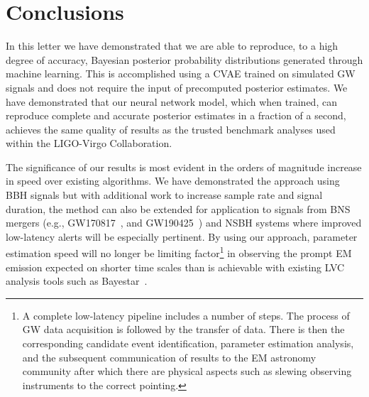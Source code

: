 %
%
%
\section{Conclusions}
In this letter we have demonstrated that we are able to reproduce, to a high
degree of accuracy, Bayesian posterior probability distributions generated
through machine learning. This is accomplished using a \ac{CVAE} trained on
simulated \ac{GW} signals and does not require the input of precomputed
posterior estimates. We have demonstrated that our neural network model, which
when trained, can reproduce  complete and accurate posterior estimates in
a fraction of a second, achieves the same quality of results as the
trusted benchmark analyses used within the LIGO-Virgo Collaboration.

%
%
The significance of our results is most evident in the orders of magnitude
increase in speed over existing algorithms. We have demonstrated the approach
using \ac{BBH} signals but with additional work to increase sample rate
and signal duration, the method can also be extended for application to
signals from \ac{BNS} mergers (e.g., GW170817~\cite{PhysRevLett.119.161101},
and GW190425~\cite{2020ApJ...892L...3A}) and \ac{NSBH} systems where
improved low-latency alerts will be especially pertinent. By using our
approach, parameter estimation speed will no longer be limiting
factor\footnote{A complete low-latency pipeline includes a number of
steps. The process of \ac{GW} data acquisition is followed by the transfer of
data. There is then the corresponding candidate event identification,
parameter estimation analysis, and the subsequent communication of results to
the \ac{EM} astronomy community after which there are physical aspects such as
slewing observing instruments to the correct pointing.} in observing the prompt
\ac{EM} emission expected on shorter time scales than is achievable with
existing \ac{LVC} analysis tools such as Bayestar~\cite{2016PhRvD..93b4013S}.

